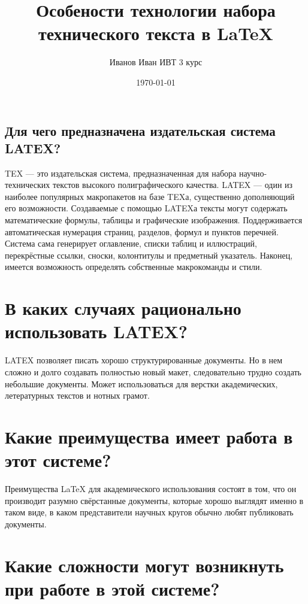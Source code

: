 \documentclass[a4paper,12pt]{article} %
\author{Иванов Иван ИВТ 3 курс}
\title{Особености технологии набора технического текста в \LaTeX{}}
\date{\today}
\begin{document}
\maketitle
\newpage

\begin{center}
\section{Для чего предназначена издательская система LATEX?}
\end{center}

\huge TEX \normalsize — это издательская система, предназначенная для набора
научно-технических текстов высокого полиграфического
качества. LATEX — один из наиболее популярных макропакетов на базе
TEXа, существенно дополняющий его возможности. Создаваемые с
помощью LATEXа тексты могут содержать математические формулы,
таблицы и графические изображения. Поддерживается автоматическая
нумерация страниц, разделов, формул и пунктов перечней. Система
сама генерирует оглавление, списки таблиц и иллюстраций,
перекрёстные ссылки, сноски, колонтитулы и предметный указатель.
Наконец, имеется возможность определять собственные макрокоманды
и стили.


\section{В каких случаях рационально использовать LATEX?}

LATEX позволяет писать хорошо структурированные документы. Но в
нем сложно и долго создавать полностью новый макет, следовательно
трудно создать небольшие документы. Может использоваться для верстки академических, летературных текстов и нотных грамот.

\section{Какие преимущества имеет работа в этот системе?}

Преимущества LaTeX для академического использования состоят в том,
что он производит разумно свёрстанные документы, которые хорошо выглядят именно в таком виде, в каком представители научных кругов
обычно любят публиковать документы.

\section{Какие сложности могут возникнуть при работе в этой системе?}
\end{document}
